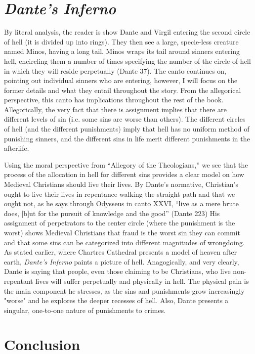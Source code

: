 \documentclass[12pt]{article}
\begin{document}
\begin{flushleft}
\section{\emph{Dante's Inferno}}

By literal analysis, the reader is show Dante and Virgil entering the second
circle of hell (it is divided up into rings). They then see a large, 
specie-less creature named Minos, having a long tail. Minos wraps its tail
around sinners entering hell, encircling them a number of times specifying
the number of the circle of hell in which they will reside perpetually (Dante 37). The
canto continues on, pointing out individual sinners who are entering, however,
I will focus on the former details and what they entail throughout the story.
From the allegorical perspective, this canto has implications throughout the rest of
the book. Allegorically, the very fact that there is assignment implies that
there are different levels of sin (i.e. some sins are worse than others).
The different circles of hell (and the different punishments) imply that
hell has no uniform method of punishing sinners, and the different sins
in life merit different punishments in the afterlife.

Using the moral perspective from ``Allegory of the Theologians,'' we see
that the process of the allocation in hell for different sins provides
a clear model on how Medieval Christians should live their lives. By
Dante's normative, Christian's ought to live their lives in repentance
walking the straight path and that we ought not, as he says through 
Odysseus in canto XXVI, ``live as a mere brute does, [b]ut for the 
pursuit of knowledge and the good'' (Dante 223) His assignment of perpetrators to the center
circle (where the punishment is the worst) shows Medieval Christians
that fraud is the worst sin they can commit and that some sins can be
categorized into different magnitudes of wrongdoing. As stated earlier,
where Chartres Cathedral presents a model of heaven after earth, 
\emph{Dante's Inferno} paints a picture of hell. Anagogically, and very clearly, Dante is
saying that people, even those claiming to be Christians, who live 
non-repentant lives will suffer perpetually and physically in hell. The
physical pain is the main component he stresses, as the sins and punishments
grow increasingly "worse" and he explores the deeper recesses of hell. Also,
Dante presents a singular, one-to-one nature of punishments to crimes.

\section{Conclusion}


\end{flushleft}
\end{document}
